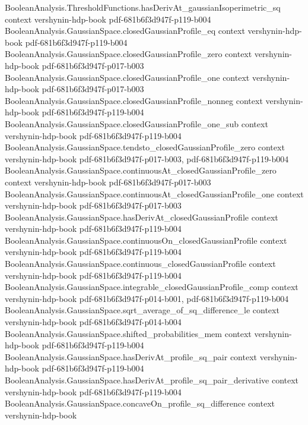 \begin{theorem}
\proofstep
  {BooleanAnalysis.ThresholdFunctions.hasDerivAt_gaussianIsoperimetric_sq}
  {context}
  {vershynin-hdp-book}
  {pdf-681b6f3d947f-p119-b004}
\proofstep
  {BooleanAnalysis.GaussianSpace.closedGaussianProfile_eq}
  {context}
  {vershynin-hdp-book}
  {pdf-681b6f3d947f-p119-b004}
\proofstep
  {BooleanAnalysis.GaussianSpace.closedGaussianProfile_zero}
  {context}
  {vershynin-hdp-book}
  {pdf-681b6f3d947f-p017-b003}
\proofstep
  {BooleanAnalysis.GaussianSpace.closedGaussianProfile_one}
  {context}
  {vershynin-hdp-book}
  {pdf-681b6f3d947f-p017-b003}
\proofstep
  {BooleanAnalysis.GaussianSpace.closedGaussianProfile_nonneg}
  {context}
  {vershynin-hdp-book}
  {pdf-681b6f3d947f-p119-b004}
\proofstep
  {BooleanAnalysis.GaussianSpace.closedGaussianProfile_one_sub}
  {context}
  {vershynin-hdp-book}
  {pdf-681b6f3d947f-p119-b004}
\proofstep
  {BooleanAnalysis.GaussianSpace.tendsto_closedGaussianProfile_zero}
  {context}
  {vershynin-hdp-book}
  {pdf-681b6f3d947f-p017-b003,
    pdf-681b6f3d947f-p119-b004}
\proofstep
  {BooleanAnalysis.GaussianSpace.continuousAt_closedGaussianProfile_zero}
  {context}
  {vershynin-hdp-book}
  {pdf-681b6f3d947f-p017-b003}
\proofstep
  {BooleanAnalysis.GaussianSpace.continuousAt_closedGaussianProfile_one}
  {context}
  {vershynin-hdp-book}
  {pdf-681b6f3d947f-p017-b003}
\proofstep
  {BooleanAnalysis.GaussianSpace.hasDerivAt_closedGaussianProfile}
  {context}
  {vershynin-hdp-book}
  {pdf-681b6f3d947f-p119-b004}
\proofstep
  {BooleanAnalysis.GaussianSpace.continuousOn_closedGaussianProfile}
  {context}
  {vershynin-hdp-book}
  {pdf-681b6f3d947f-p119-b004}
\proofstep
  {BooleanAnalysis.GaussianSpace.continuous_closedGaussianProfile}
  {context}
  {vershynin-hdp-book}
  {pdf-681b6f3d947f-p119-b004}
\proofstep
  {BooleanAnalysis.GaussianSpace.integrable_closedGaussianProfile_comp}
  {context}
  {vershynin-hdp-book}
  {pdf-681b6f3d947f-p014-b001,
    pdf-681b6f3d947f-p119-b004}
\proofstep
  {BooleanAnalysis.GaussianSpace.sqrt_average_of_sq_difference_le}
  {context}
  {vershynin-hdp-book}
  {pdf-681b6f3d947f-p014-b004}
\proofstep
  {BooleanAnalysis.GaussianSpace.shifted_probabilities_mem}
  {context}
  {vershynin-hdp-book}
  {pdf-681b6f3d947f-p119-b004}
\proofstep
  {BooleanAnalysis.GaussianSpace.hasDerivAt_profile_sq_pair}
  {context}
  {vershynin-hdp-book}
  {pdf-681b6f3d947f-p119-b004}
\proofstep
  {BooleanAnalysis.GaussianSpace.hasDerivAt_profile_sq_pair_derivative}
  {context}
  {vershynin-hdp-book}
  {pdf-681b6f3d947f-p119-b004}
\proofstep
  {BooleanAnalysis.GaussianSpace.concaveOn_profile_sq_difference}
  {context}
  {vershynin-hdp-book}

\end{theorem}
